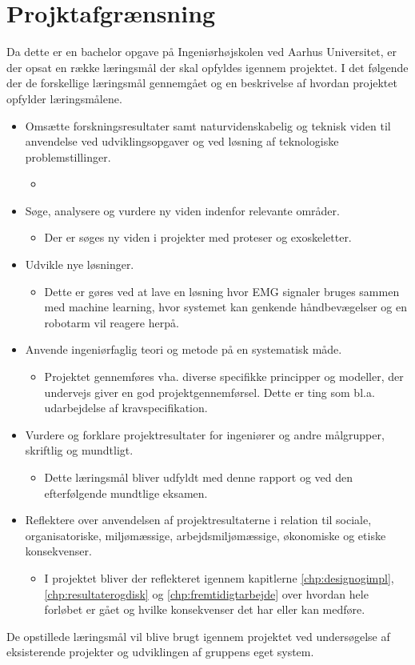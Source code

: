 \thispagestyle{fancy}
\chapter{Projktafgrænsning}
\label{chp:projektafgraensning}
Da dette er en bachelor opgave på Ingeniørhøjskolen ved Aarhus Universitet, er der opsat en række læringsmål der skal opfyldes igennem projektet. I det følgende der de forskellige læringsmål gennemgået og en beskrivelse af hvordan projektet opfylder læringsmålene.
\begin{itemize}
	\item Omsætte forskningsresultater samt naturvidenskabelig og teknisk viden til anvendelse ved udviklingsopgaver og ved løsning af teknologiske problemstillinger.
	\begin{itemize}
		\item 
	\end{itemize}
	\item Søge, analysere og vurdere ny viden indenfor relevante områder.
	\begin{itemize}
		\item Der er søges ny viden i projekter med proteser og exoskeletter. 
	\end{itemize}
	\item Udvikle nye løsninger.
	\begin{itemize}
		\item Dette er gøres ved at lave en løsning hvor EMG signaler bruges sammen med machine learning, hvor systemet kan genkende håndbevægelser og en robotarm vil reagere herpå.
	\end{itemize}
	\item Anvende ingeniørfaglig teori og metode på en systematisk måde.
	\begin{itemize}
		\item Projektet gennemføres vha. diverse specifikke principper og modeller, der undervejs giver en god projektgennemførsel. Dette er ting som bl.a. udarbejdelse af kravspecifikation.
	\end{itemize}
	\item Vurdere og forklare projektresultater for ingeniører og andre målgrupper, skriftlig og mundtligt.
	\begin{itemize}
		\item Dette læringsmål bliver udfyldt med denne rapport og ved den efterfølgende mundtlige eksamen.
	\end{itemize}
	\item Reflektere over anvendelsen af projektresultaterne i relation til sociale, organisatoriske, miljømæssige, arbejdsmiljømæssige, økonomiske og etiske konsekvenser.
	\begin{itemize}
		\item I projektet bliver der reflekteret igennem kapitlerne \ref{chp:designogimpl}, \ref{chp:resultaterogdisk} og \ref{chp:fremtidigtarbejde} over hvordan hele forløbet er gået og hvilke konsekvenser det har eller kan medføre.
	\end{itemize}
\end{itemize}

De opstillede læringsmål vil blive brugt igennem projektet ved undersøgelse af eksisterende projekter og udviklingen af gruppens eget system.

